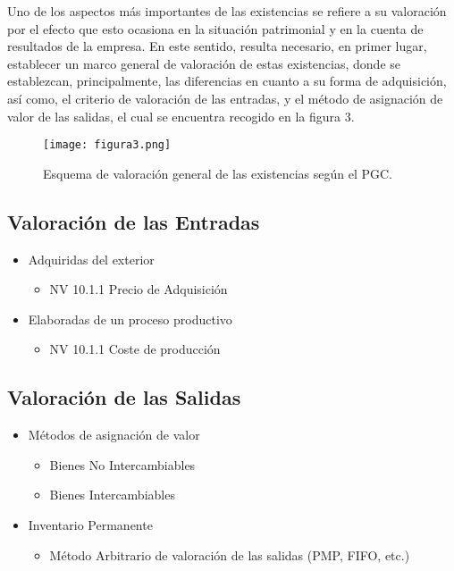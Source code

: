 \documentclass{article}
\begin{document}
Uno de los aspectos más importantes de las existencias se refiere a su valoración por el efecto que esto ocasiona en la situación patrimonial y en la cuenta de resultados de la empresa. En este sentido, resulta necesario, en primer lugar, establecer un marco general de valoración de estas existencias, donde se establezcan, principalmente, las diferencias en cuanto a su forma de adquisición, así como, el criterio de valoración de las entradas, y el método de asignación de valor de las salidas, el cual se encuentra recogido en la figura 3.

\begin{figure}[H]
    \centering
    \texttt{[image: figura3.png]}
    \caption{Esquema de valoración general de las existencias según el PGC.}
\end{figure}

\subsection{Valoración de las Entradas}
\begin{itemize}
    \item Adquiridas del exterior
    \begin{itemize}
        \item NV 10.1.1 Precio de Adquisición
    \end{itemize}
    \item Elaboradas de un proceso productivo
    \begin{itemize}
        \item NV 10.1.1 Coste de producción
    \end{itemize}
\end{itemize}

\subsection{Valoración de las Salidas}
\begin{itemize}
    \item Métodos de asignación de valor
    \begin{itemize}
        \item Bienes No Intercambiables
        \item Bienes Intercambiables
    \end{itemize}
    \item Inventario Permanente
    \begin{itemize}
        \item Método Arbitrario de valoración de las salidas (PMP, FIFO, etc.)
    \end{itemize}
\end{itemize}
\end{document}
